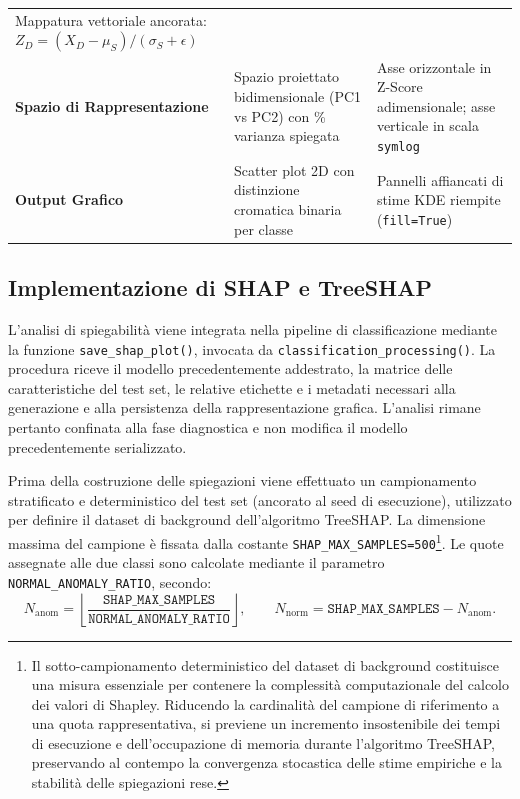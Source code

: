 \begin{table}[H]
\begin{tabularx}{\textwidth}{>{\raggedright\arraybackslash}p{4cm} >{\raggedright\arraybackslash}X >{\raggedright\arraybackslash}X}
        Mappatura vettoriale ancorata: $Z_D = (X_D - \mu_S)/(\sigma_S + \epsilon)$ \\
        \addlinespace
        \textbf{Spazio di Rappresentazione} & 
        Spazio proiettato bidimensionale (PC1 vs PC2) con \% varianza spiegata & 
        Asse orizzontale in Z-Score adimensionale; asse verticale in scala \texttt{symlog} \\
        \addlinespace
        \textbf{Output Grafico} & 
        Scatter plot 2D con distinzione cromatica binaria per classe & 
        Pannelli affiancati di stime KDE riempite (\texttt{fill=True}) \\
        \bottomrule
    \end{tabularx}
\end{table}

\subsection{Implementazione di SHAP e TreeSHAP}
\label{subsec:implementazione_shap}

L'analisi di spiegabilità viene integrata nella pipeline di classificazione mediante la funzione \texttt{save\_shap\_plot()}, invocata da \texttt{classification\_processing()}. 
La procedura riceve il modello precedentemente addestrato, la matrice delle caratteristiche del test set, le relative etichette e i metadati necessari alla generazione e alla persistenza della rappresentazione grafica. 
L'analisi rimane pertanto confinata alla fase diagnostica e non modifica il modello precedentemente serializzato.

Prima della costruzione delle spiegazioni viene effettuato un campionamento stratificato e deterministico del test set (ancorato al seed di esecuzione), utilizzato per definire il dataset di background dell'algoritmo TreeSHAP. 
La dimensione massima del campione è fissata dalla costante \texttt{SHAP\_MAX\_SAMPLES=500}\footnote{Il sotto-campionamento deterministico del dataset di background costituisce una misura essenziale per contenere la complessità computazionale del calcolo dei valori di Shapley. Riducendo la cardinalità del campione di riferimento a una quota rappresentativa, si previene un incremento insostenibile dei tempi di esecuzione e dell'occupazione di memoria durante l'algoritmo TreeSHAP, preservando al contempo la convergenza stocastica delle stime empiriche e la stabilità delle spiegazioni rese.}. 
Le quote assegnate alle due classi sono calcolate mediante il parametro \texttt{NORMAL\_ANOMALY\_RATIO}, secondo:
\begin{equation}
N_{\mathrm{anom}} =
\left\lfloor
\frac{\texttt{SHAP\_MAX\_SAMPLES}}
{\texttt{NORMAL\_ANOMALY\_RATIO}}
\right\rfloor,
\qquad
N_{\mathrm{norm}} =
\texttt{SHAP\_MAX\_SAMPLES}-N_{\mathrm{anom}}.
\label{eq:shap_sample_quotas}
\end{equation}

